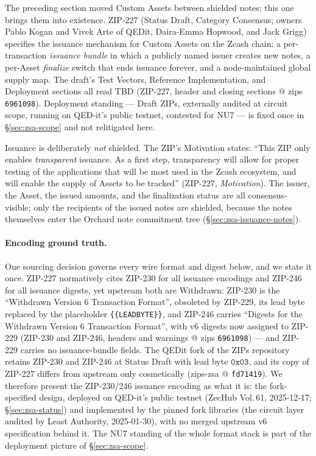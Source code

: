 \documentclass[11pt,a4paper]{article}
\theoremstyle{definition}
\begin{document}
The preceding section moved Custom Assets between shielded notes; this one
brings them into existence. ZIP-227 (Status Draft, Category Consensus;
owners Pablo Kogan and Vivek Arte of QEDit, Daira-Emma Hopwood, and Jack
Grigg) specifies the issuance mechanism for Custom Assets on the Zcash
chain: a per-transaction \emph{issuance bundle} in which a publicly named
issuer creates new notes, a per-Asset \emph{finalize} switch that ends
issuance forever, and a node-maintained global supply map. The draft's Test
Vectors, Reference Implementation, and Deployment sections all read TBD
(ZIP-227, header and closing sections @ zips \texttt{6961098}). Deployment
standing --- Draft ZIPs, externally audited at circuit scope, running on
QED-it's public testnet, contested for NU7 --- is fixed once in
\S\ref{sec:zsa-scope} and not relitigated here.

Issuance is deliberately \emph{not} shielded. The ZIP's Motivation states:
``This ZIP only enables \emph{transparent} issuance. As a first step,
transparency will allow for proper testing of the applications that will be
most used in the Zcash ecosystem, and will enable the supply of Assets to
be tracked'' (ZIP-227, \emph{Motivation}). The issuer, the Asset, the
issued amounts, and the finalization status are all consensus-visible;
only the recipients of the issued notes are shielded, because the notes
themselves enter the Orchard note commitment tree
(\S\ref{sec:zsa-issuance-notes}).

\paragraph{Encoding ground truth.} One sourcing decision governs every
wire format and digest below, and we state it once. ZIP-227 normatively
cites ZIP-230 for all issuance encodings and ZIP-246 for all issuance
digests, yet upstream both are Withdrawn: ZIP-230 is the ``Withdrawn
Version 6 Transaction Format'', obsoleted by ZIP-229, its lead byte
replaced by the placeholder \texttt{\{\{LEADBYTE\}\}}, and ZIP-246 carries
``Digests for the Withdrawn Version 6 Transaction Format'', with v6
digests now assigned to ZIP-229 (ZIP-230 and ZIP-246, headers and
warnings @ zips \texttt{6961098}) --- and ZIP-229 carries no
issuance-bundle fields. The QEDit fork of the ZIPs repository retains
ZIP-230 and ZIP-246 at Status Draft with lead byte $\mathtt{0x03}$, and
its copy of ZIP-227 differs from upstream only cosmetically (zips-zsa @
\texttt{fd71419}). We therefore present the ZIP-230/246 issuance encoding
as what it is: the fork-specified design, deployed on QED-it's public
testnet (ZecHub Vol.\,61, 2025-12-17; \S\ref{sec:zsa-status}) and
implemented by the pinned fork libraries (the circuit layer audited by
Least Authority, 2025-01-30), with no merged upstream v6 specification
behind it.
The NU7 standing of the whole format stack is part of the deployment
picture of \S\ref{sec:zsa-scope}.
\end{document}
